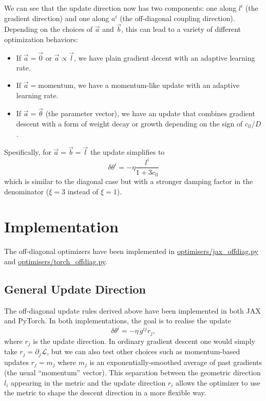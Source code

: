 \documentclass{article}
\newcommand{\loss}{\mathcal{L}}
\begin{document}
We can see that the update direction now has two components: one along $l^i$ (the gradient direction)
and one along $a^i$ (the off-diagonal coupling direction).
Depending on the choices of $\vec{a}$ and $\vec{b}$, this can lead to a variety of different optimization behaviors:
\begin{itemize}
    \item If $\vec{a}=\vec{0}$ or $\vec{a}\propto \vec{l}$, we have plain gradient decent with an adaptive learning rate.
    \item If $\vec{a}=\text{momentum}$, we have a momentum-like update with an adaptive learning rate.
    \item If $\vec{a}=\vec{\theta}$ (the parameter vector), we have an update that combines gradient descent with a form of weight decay or growth depending on the sign of $c_{ll}/D$.
\end{itemize}
Spesifically, for $\vec{a}=\vec{b}=\vec{l}$ the update simplifies to $$
    \delta\theta^i = -\eta \frac{l^i}{1+3 c_{ll}}
$$ which is similar to the diagonal case but with a stronger damping factor in the denominator ($\xi=3$ instead of $\xi=1$).


\section{Implementation}
The off-diagonal optimizers have been implemented in 
\href{https://github.com/Noah-Everett/Induced-Metric-Optimiser/blob/f6dbb04c8fe5605c415b4aa3de1706dc4bbab842/optimisers/jax_offdiag.py}{optimisers/jax\_offdiag.py} 
and 
\href{https://github.com/Noah-Everett/Induced-Metric-Optimiser/blob/f6dbb04c8fe5605c415b4aa3de1706dc4bbab842/optimisers/torch_offdiag.py}{optimisers/torch\_offdiag.py}.

\subsection*{General Update Direction}
The off-diagonal update rules derived above have been implemented in both JAX and PyTorch.
In both implementations, the goal is to realise the update $$
    \delta\theta^i = -\eta\, g^{ij} r_j,
$$ where $r_j$ is the update direction.
In ordinary gradient descent one would simply take $r_j = \partial_j \loss$,
but we can also test other choices such as momentum-based updates $r_j = m_j$ where $m_j$
is an exponentially-smoothed average of past gradients (the usual ``momentum'' vector).
This separation between the geometric direction $l_i$ appearing in the metric
and the update direction $r_i$ allows the optimizer to use the metric
to shape the descent direction in a more flexible way.
\end{document}
